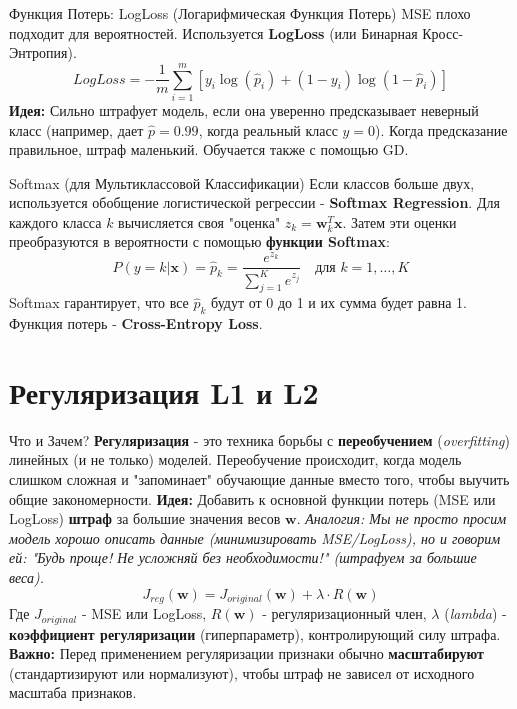 \begin{myblock}{Функция Потерь: LogLoss (Логарифмическая Функция Потерь)}
MSE плохо подходит для вероятностей. Используется \textbf{LogLoss} (или Бинарная Кросс-Энтропия).
\[
LogLoss = -\frac{1}{m} \sum_{i=1}^{m} [ y_i \log(\hat{p}_i) + (1 - y_i) \log(1 - \hat{p}_i) ]
\]
\textbf{Идея:} Сильно штрафует модель, если она уверенно предсказывает неверный класс (например, дает $\hat{p}=0.99$, когда реальный класс $y=0$). Когда предсказание правильное, штраф маленький. Обучается также с помощью GD.
\end{myblock}

\begin{textbox}{Softmax (для Мультиклассовой Классификации)}
Если классов больше двух, используется обобщение логистической регрессии - \textbf{Softmax Regression}. Для каждого класса $k$ вычисляется своя "оценка" $z_k = \mathbf{w}_k^T \mathbf{x}$. Затем эти оценки преобразуются в вероятности с помощью \textbf{функции Softmax}:
\[
P(y=k | \mathbf{x}) = \hat{p}_k = \frac{e^{z_k}}{\sum_{j=1}^{K} e^{z_j}} \quad \text{для } k = 1, \dots, K
\]
Softmax гарантирует, что все $\hat{p}_k$ будут от 0 до 1 и их сумма будет равна 1. Функция потерь - \textbf{Cross-Entropy Loss}.
\end{textbox}

\section{Регуляризация L1 и L2}

\begin{alerttextbox}{Что и Зачем?}
\textbf{Регуляризация} - это техника борьбы с \textbf{переобучением} (\textit{overfitting}) линейных (и не только) моделей. Переобучение происходит, когда модель слишком сложная и "запоминает" обучающие данные вместо того, чтобы выучить общие закономерности.
\textbf{Идея:} Добавить к основной функции потерь (MSE или LogLoss) \textbf{штраф} за большие значения весов $\mathbf{w}$.
\textit{Аналогия: Мы не просто просим модель хорошо описать данные (минимизировать MSE/LogLoss), но и говорим ей: "Будь проще! Не усложняй без необходимости!" (штрафуем за большие веса).}
\[
J_{reg}(\mathbf{w}) = J_{original}(\mathbf{w}) + \lambda \cdot R(\mathbf{w})
\]
Где $J_{original}$ - MSE или LogLoss, $R(\mathbf{w})$ - регуляризационный член, $\lambda$ (\textit{lambda}) - \textbf{коэффициент регуляризации} (гиперпараметр), контролирующий силу штрафа.
\textbf{Важно:} Перед применением регуляризации признаки обычно \textbf{масштабируют} (стандартизируют или нормализуют), чтобы штраф не зависел от исходного масштаба признаков.
\end{alerttextbox}

